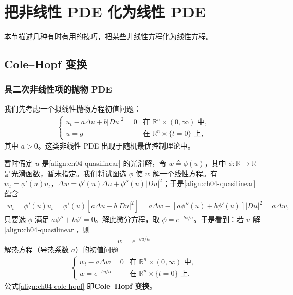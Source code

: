 \documentclass[../../main.tex]{subfiles}
\begin{document}
\section{把非线性 PDE 化为线性 PDE}\label{section:ch04-convert}

本节描述几种有时有用的技巧，把某些非线性方程化为线性方程。

\subsection{Cole--Hopf 变换}\label{subsection:ch04-cole-hopf}

\subsubsection{具二次非线性项的抛物 PDE}

我们先考虑一个拟线性抛物方程初值问题：
\begin{align}\label{align:ch04-quasilinear}
\begin{cases}
u_t-a\Delta u+b|Du|^2=0 & \text{在 }\mathbb{R}^n\times(0,\infty)\text{ 中},\\
u=g & \text{在 }\mathbb{R}^n\times\{t=0\}\text{ 上},
\end{cases}
\end{align}
其中 $a>0$。这类非线性 PDE 出现于随机最优控制理论中。

暂时假定 $u$ 是\eqref{align:ch04-quasilinear} 的光滑解，令 $w\triangleq\phi(u)$，其中 $\phi:\mathbb{R}\to\mathbb{R}$ 是光滑函数，暂未指定。我们将试图选 $\phi$ 使 $w$ 解一个线性方程。有 $w_t=\phi'(u)u_t$，$\Delta w=\phi'(u)\Delta u+\phi''(u)|Du|^2$；于是\eqref{align:ch04-quasilinear} 蕴含
\begin{align*}
w_t=\phi'(u)u_t=\phi'(u)[a\Delta u-b|Du|^2]=a\Delta w-[a\phi''(u)+b\phi'(u)]|Du|^2=a\Delta w,
\end{align*}
只要选 $\phi$ 满足 $a\phi''+b\phi'=0$。解此微分方程，取 $\phi=e^{-bz/a}$。于是看到：若 $u$ 解\eqref{align:ch04-quasilinear}，则
\begin{align}\label{align:ch04-cole-hopf}
w=e^{-bu/a}
\end{align}
解热方程（导热系数 $a$）的初值问题
\begin{align}\label{align:ch04-cole-hopf-heat}
\begin{cases}
w_t-a\Delta w=0 & \text{在 }\mathbb{R}^n\times(0,\infty)\text{ 中},\\
w=e^{-bg/a} & \text{在 }\mathbb{R}^n\times\{t=0\}\text{ 上}.
\end{cases}
\end{align}
公式\eqref{align:ch04-cole-hopf} 即\textbf{Cole--Hopf 变换}。
\end{document}
